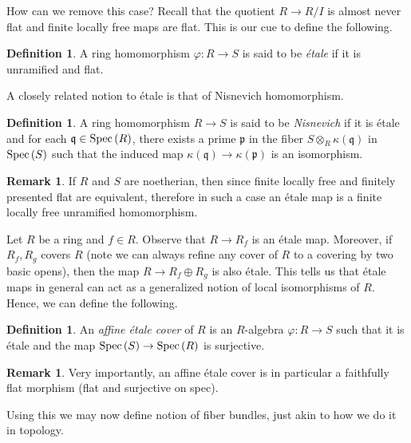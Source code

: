 \documentclass[letterpaper,10pt,twoside]{amsart}
\newcommand{\spec}[1]{{\fontfamily{lmss}\selectfont 
		\text{\rm Spec}\left(#1\right )
}}
\newcommand{\ideal}[1]{\mathfrak{#1}}
\newcommand{\tens}{\otimes}
\theoremstyle{proposition}
\theoremstyle{definition}
\newtheorem{definition}[proposition]{Definition}
\theoremstyle{theorem}
\theoremstyle{definition}
\newtheorem{remark}[proposition]{\textbf{Remark}}
\theoremstyle{definition}
\theoremstyle{definition}
\theoremstyle{lemma}
\theoremstyle{definition}
\theoremstyle{definition}
\theoremstyle{corollary}
\theoremstyle{definition}
\begin{document}
	How can we remove this case? Recall that the quotient $R \to R/I$ is almost never flat and finite locally free maps are flat. This is our cue to define the following.
	\begin{definition}
		A ring homomorphism $\varphi : R\to S$ is said to be \textit{\'etale }if it is unramified and flat.
	\end{definition}
	A closely related notion to \'etale is that of Nisnevich homomorphism.
	\begin{definition}
		A ring homomorphism $R\to S$ is said to be \textit{Nisnevich} if it is \'etale and for each $\ideal{q} \in \spec{R}$, there exists a prime $\ideal{p}$ in the fiber $S\tens_{R} \kappa(\ideal{q})$ in $\spec{S}$ such that the induced map $\kappa(\ideal{q}) \to \kappa(\ideal{p})$ is an isomorphism.
	\end{definition}
	\begin{remark}
		If $R$ and $S$ are noetherian, then since finite locally free and finitely presented flat are equivalent, therefore in such a case an \'etale map is a finite locally free unramified homomorphism.
	\end{remark}
	Let $R$ be a ring and $f\in R$. Observe that $R\to R_f$ is an \'etale map. Moreover, if $R_f,R_g$ covers $R$ (note we can always refine any cover of $R$ to a covering by two basic opens), then the map $R \to R_f\oplus R_g$ is also \'etale. This tells us that \'etale maps in general can act as a generalized notion of local isomorphisms of $R$. Hence, we can define the following.
	\begin{definition}
		An \textit{affine \'etale cover} of $R$ is an $R$-algebra $\varphi  : R\to S$ such that it is \'etale and the map $\spec{S} \to \spec{R}$ is surjective. 
	\end{definition}
	\begin{remark}\label{R-Etale covers are faithfully flat}
		Very importantly, an affine \'etale cover is in particular a faithfully flat morphism (flat and surjective on spec).
	\end{remark}
	Using this we may now define notion of fiber bundles, just akin to how we do it in topology.
\end{document}
